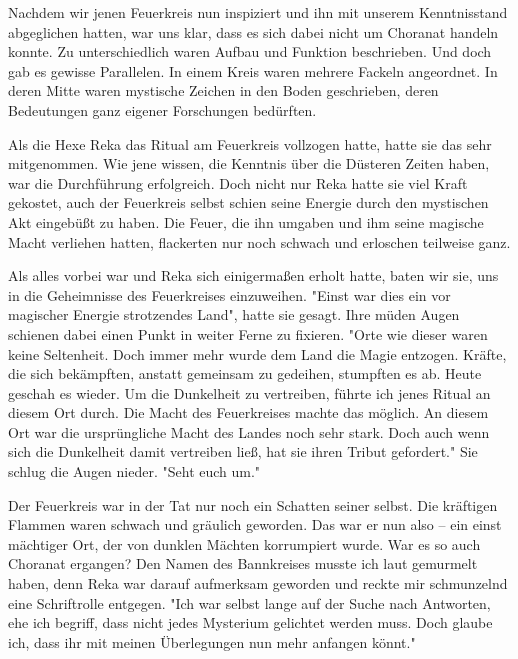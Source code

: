 \documentclass[10pt, a4paper, oneside]{book}
\begin{document}
\begin{multicols}{2}
Nachdem wir jenen Feuerkreis nun inspiziert und ihn mit unserem Kenntnisstand abgeglichen hatten, war uns klar, dass es sich dabei nicht um Choranat handeln konnte. Zu unterschiedlich waren Aufbau und Funktion beschrieben. Und doch gab es gewisse Parallelen. In einem Kreis waren mehrere Fackeln angeordnet. In deren Mitte waren mystische Zeichen in den Boden geschrieben, deren Bedeutungen ganz eigener Forschungen bedürften.

Als die Hexe Reka das Ritual am Feuerkreis vollzogen hatte, hatte sie das sehr mitgenommen. Wie jene wissen, die Kenntnis über die Düsteren Zeiten haben, war die Durchführung erfolgreich. Doch nicht nur Reka hatte sie viel Kraft gekostet, auch der Feuerkreis selbst schien seine Energie durch den mystischen Akt eingebüßt zu haben. Die Feuer, die ihn umgaben und ihm seine magische Macht verliehen hatten, flackerten nur noch schwach und erloschen teilweise ganz.\bigskip

Als alles vorbei war und Reka sich einigermaßen erholt hatte, baten wir sie, uns in die Geheimnisse des Feuerkreises einzuweihen. "Einst war dies ein vor magischer Energie strotzendes Land", hatte sie gesagt. Ihre müden Augen schienen dabei einen Punkt in weiter Ferne zu fixieren. "Orte wie dieser waren keine Seltenheit. Doch immer mehr wurde dem Land die Magie entzogen. Kräfte, die sich bekämpften, anstatt gemeinsam zu gedeihen, stumpften es ab. Heute geschah es wieder. Um die Dunkelheit zu vertreiben, führte ich jenes Ritual an diesem Ort durch. Die Macht des Feuerkreises machte das möglich. An diesem Ort war die ursprüngliche Macht des Landes noch sehr stark. Doch auch wenn sich die Dunkelheit damit vertreiben ließ, hat sie ihren Tribut gefordert." Sie schlug die Augen nieder. "Seht euch um."\bigskip

Der Feuerkreis war in der Tat nur noch ein Schatten seiner selbst. Die kräftigen Flammen waren schwach und gräulich geworden. Das war er nun also – ein einst mächtiger Ort, der von dunklen Mächten korrumpiert wurde. War es so auch Choranat ergangen? Den Namen des Bannkreises musste ich laut gemurmelt haben, denn Reka war darauf aufmerksam geworden und reckte mir schmunzelnd eine Schriftrolle entgegen. "Ich war selbst lange auf der Suche nach Antworten, ehe ich begriff, dass nicht jedes Mysterium gelichtet werden muss. Doch glaube ich, dass ihr mit meinen Überlegungen nun mehr anfangen könnt."\bigskip


\end{multicols}
\end{document}
